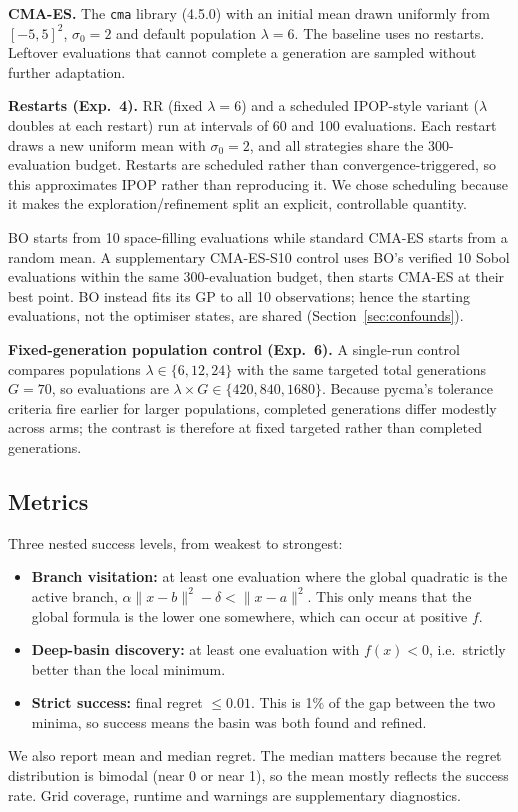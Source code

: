\documentclass[11pt,a4paper]{article}
\newcommand{\norm}[1]{\lVert #1\rVert}
\begin{document}
\textbf{CMA-ES.} The \texttt{cma} library (4.5.0) with an initial mean drawn uniformly from $[-5,5]^2$, $\sigma_0=2$ and default population $\lambda=6$. The baseline uses no restarts. Leftover evaluations that cannot complete a generation are sampled without further adaptation.

\textbf{Restarts (Exp.\ 4).} RR (fixed $\lambda=6$) and a scheduled IPOP-style variant ($\lambda$ doubles at each restart) run at intervals of 60 and 100 evaluations. Each restart draws a new uniform mean with $\sigma_0=2$, and all strategies share the 300-evaluation budget. Restarts are scheduled rather than convergence-triggered, so this approximates IPOP rather than reproducing it. We chose scheduling because it makes the exploration/refinement split an explicit, controllable quantity.

BO starts from 10 space-filling evaluations while standard CMA-ES starts from a random mean. A supplementary CMA-ES-S10 control uses BO's verified 10 Sobol evaluations within the same 300-evaluation budget, then starts CMA-ES at their best point. BO instead fits its GP to all 10 observations; hence the starting evaluations, not the optimiser states, are shared (Section~\ref{sec:confounds}).

\textbf{Fixed-generation population control (Exp.\ 6).} A single-run control compares populations $\lambda\in\{6,12,24\}$ with the same targeted total generations $G=70$, so evaluations are $\lambda \times G \in \{420,840,1680\}$. Because pycma's tolerance criteria fire earlier for larger populations, completed generations differ modestly across arms; the contrast is therefore at fixed targeted rather than completed generations.

\subsection{Metrics}\label{sec:metrics}
Three nested success levels, from weakest to strongest:
\begin{itemize}
  \item \textbf{Branch visitation:} at least one evaluation where the global quadratic is the active branch, $\alpha\norm{x-b}^2-\delta<\norm{x-a}^2$. This only means that the global formula is the lower one somewhere, which can occur at positive $f$.
  \item \textbf{Deep-basin discovery:} at least one evaluation with $f(x)<0$, i.e.\ strictly better than the local minimum.
  \item \textbf{Strict success:} final regret $\le 0.01$. This is 1\% of the gap between the two minima, so success means the basin was both found and refined.
\end{itemize}
We also report mean and median regret. The median matters because the regret distribution is bimodal (near 0 or near 1), so the mean mostly reflects the success rate. Grid coverage, runtime and warnings are supplementary diagnostics.
\end{document}
